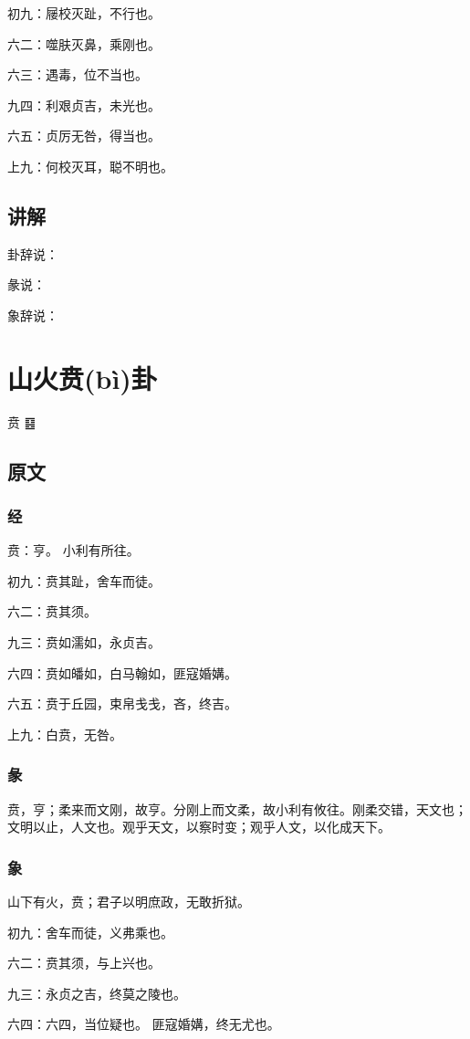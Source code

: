 \documentclass[12pt,oneside]{book}
\begin{document}
初九：屦校灭趾，不行也。

六二：噬肤灭鼻，乘刚也。

六三：遇毒，位不当也。

九四：利艰贞吉，未光也。

六五：贞厉无咎，得当也。

上九：何校灭耳，聪不明也。

\section{讲解}
卦辞说：

彖说：

象辞说：

\chapter{山火贲(bì)卦}
贲 {\Large ䷕}

\section{原文}
\subsection{经}
贲：亨。 小利有所往。

初九：贲其趾，舍车而徒。

六二：贲其须。

九三：贲如濡如，永贞吉。

六四：贲如皤如，白马翰如，匪寇婚媾。

六五：贲于丘园，束帛戋戋，吝，终吉。

上九：白贲，无咎。

\subsection{彖}
贲，亨；柔来而文刚，故亨。分刚上而文柔，故小利有攸往。刚柔交错，天文也；文明以止，人文也。观乎天文，以察时变；观乎人文，以化成天下。
\subsection{象}
山下有火，贲；君子以明庶政，无敢折狱。

初九：舍车而徒，义弗乘也。

六二：贲其须，与上兴也。

九三：永贞之吉，终莫之陵也。

六四：六四，当位疑也。 匪寇婚媾，终无尤也。
\end{document}
